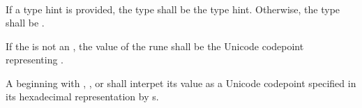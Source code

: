 \begin{grammar}
 \\
	   \\

 \\
	 \\
	 \\

 \exactly \\
	 \\
	   \\
	  \\
	  \\


 \exactly \\
	    \\

 \exactly \\
	  \\

 \oneof \\
	\terminal{\textbackslash\textbackslash}
	 \\
\end{grammar}

\specsubsubitem
If a type hint is provided, the type shall be the type hint. Otherwise, the type
shall be .

\specsubsubitem
If the  is not an , the
value of the rune shall be the Unicode codepoint representing
.

\specsubsubitem
A  beginning with ,
, or  shall interpet
its value as a Unicode codepoint specified in its hexadecimal representation by
s.

